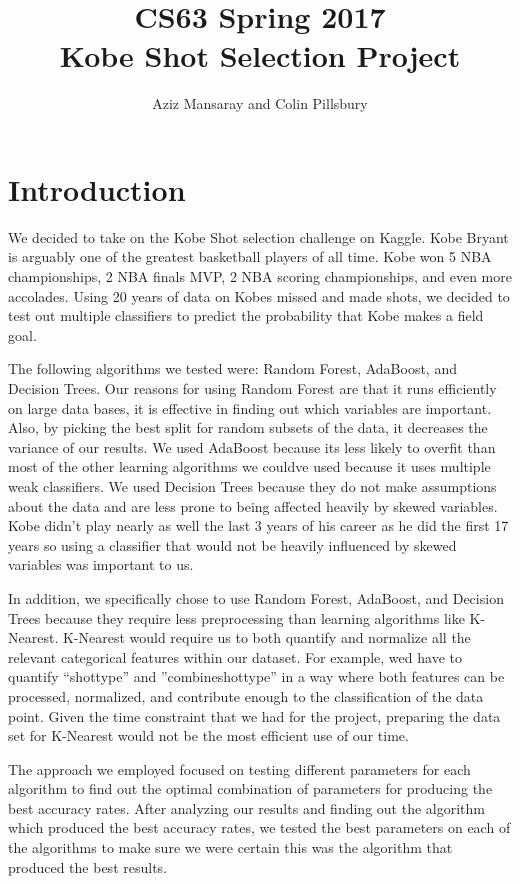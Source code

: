 \documentclass[11pt]{article}
\title{CS63 Spring 2017\\Kobe Shot Selection Project}
\author{Aziz Mansaray and Colin Pillsbury}
\date{}
\begin{document}
\maketitle

\section{Introduction}

We decided to take on the Kobe Shot selection challenge on Kaggle. Kobe Bryant is arguably one of the greatest basketball players of all time. Kobe won 5 NBA championships, 2 NBA finals MVP, 2 NBA scoring championships, and even more accolades. Using 20 years of data on Kobe\textquotesingle s missed and made shots, we decided to test out multiple classifiers to predict the probability that Kobe makes a field goal. 

The following algorithms we tested were: Random Forest, AdaBoost, and Decision Trees. Our reasons for using Random Forest are that it runs efficiently on large data bases, it is effective in finding out which variables are important. Also, by picking the best split for random subsets of the data, it decreases the variance of our results. We used AdaBoost because it\textquotesingle s less likely to overfit than most of the other learning algorithms we could\textquotesingle ve used because it uses multiple weak classifiers. We used Decision Trees because they do not make assumptions about the data and are less prone to being affected heavily by skewed variables. Kobe didn’t play nearly as well the last 3 years of his career as he did the first 17 years so using a classifier that would not be heavily influenced by skewed variables was important to us. 

In addition, we specifically chose to use Random Forest, AdaBoost, and Decision Trees because they require less preprocessing than learning algorithms like K-Nearest. K-Nearest would require us to both quantify and normalize all the relevant categorical features within our dataset. For example, we\textquotesingle d have to quantify ``shot\textunderscore type'' and ''combine\textunderscore shot\textunderscore type'' in a way where both features can be processed, normalized, and contribute enough to the classification of the data point. Given the time constraint that we had for the project, preparing the data set for K-Nearest would not be the most efficient use of our time.

The approach we employed focused on testing different parameters for each algorithm to find out the optimal combination of parameters for producing the best accuracy rates. After analyzing our results and finding out the algorithm which produced the best accuracy rates, we tested the best parameters on each of the algorithms to make sure we were certain this was the algorithm that produced the best results. 
\end{document}
